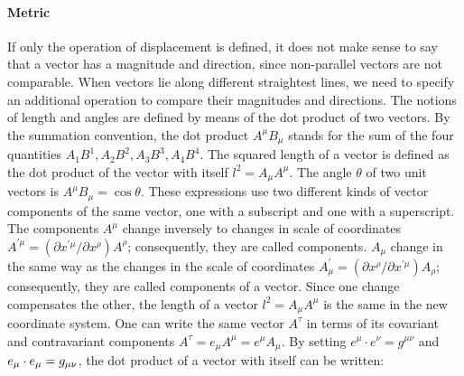 \documentclass[submitted]{article}
\begin{document}
\paragraph{Metric} If only the operation of displacement is defined, it does not make sense to say that a vector has a magnitude and direction, since non-parallel vectors are not comparable. When vectors lie along different straightest lines, we need to specify an additional operation to compare their magnitudes and directions. The notions of length and angles are defined by means of the dot product of two vectors. By the summation convention, the dot product $A^\mu B_\mu$ stands for the sum of the four quantities $A_{1} B^{1}, A_{2} B^{2}, A_{3} B^{3}, A_{4} B^{4}$. The squared length of a vector is defined as the dot product of the vector with itself $l^2 = A_{\mu} A^{\mu}$. The angle $\theta$ of two unit vectors is $A^\mu B_\mu = \cos{\theta}$. These expressions use two different kinds of vector components of the same vector, one with a subscript and one with a superscript. The components $A^\mu$ change inversely to changes in scale of coordinates $A^{\prime \mu}=\left(\partial x^{\prime \mu} / \partial x^{\rho}\right) A^{\rho}$; consequently, they are called  components. $A_\mu$ change in the same way as the changes in the scale of coordinates $A_{\mu}^{\prime}=\left(\partial x^{\rho} / \partial x^{\prime \mu}\right) A_{\rho}$; consequently, they are called  components of a vector. Since one change compensates the other, the length of a vector $l^2 = A_{\mu} A^{\mu}$ is the same in the new coordinate system. One can write the same vector $A^\tau$ in terms of its covariant and contravariant components $A^\tau= e_\mu A^\mu = e^\mu A_\mu$. By setting $e^\mu \cdot e^\nu = g^{\mu\nu}$ and $e_\mu \cdot e_\mu = g_{\mu\nu}$, the dot product of a vector with itself can be written:
 
\end{document}
